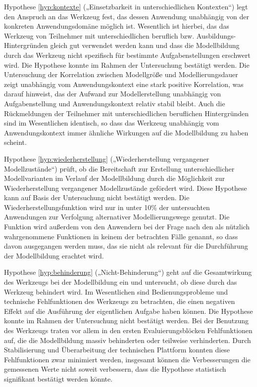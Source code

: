 Hypothese \ref{hyp:kontexte} („Einsetzbarkeit in unterschiedlichen Kontexten“) legt den Anspruch an das Werkzeug fest, das dessen Anwendung unabhängig von der konkreten Anwendungsdomäne möglich ist. Wesentlich ist hierbei, das das Werkzeug von Teilnehmer mit unterschiedlichen beruflich bzw. Ausbildungs-Hintergründen gleich gut verwendet werden kann und dass die Modellbildung durch das Werkzeug nicht spezifisch für bestimmte Aufgabenstellungen erschwert wird. Die Hypothese konnte im Rahmen der Untersuchung bestätigt werden. Die Untersuchung der Korrelation zwischen Modellgröße und Modellierungsdauer zeigt unabhängig vom Anwendungskontext eine stark positive Korrelation, was darauf hinweist, das der Aufwand zur Modellerstellung unabhängig von Aufgabenstellung und Anwendungskontext relativ stabil bleibt. Auch die Rückmeldungen der Teilnehmer mit unterschiedlichen beruflichen Hintergründen sind im Wesentlichen identisch, so dass das Werkzeug unabhängig vom Anwendungskontext immer ähnliche Wirkungen auf die Modellbildung zu haben scheint. 

Hypothese \ref{hyp:wiederherstellung} („Wiederherstellung vergangener Modellzustände“) prüft, ob die Bereitschaft zur Erstellung unterschiedlicher Modellvarianten im Verlauf der Modellbildung durch die Möglichkeit zur Wiederherstellung vergangener Modellzustände gefördert wird. Diese Hypothese kann auf Basis der Untersuchung nicht bestätigt werden. Die Wiederherstellungsfunktion wird nur in unter 10\% der untersuchten Anwendungen zur Verfolgung alternativer Modellierungswege genutzt. Die Funktion wird außerdem von den Anwendern bei der Frage nach den als nützlich wahrgenommene Funktionen in keinem der betrachten Fälle genannt, so dass davon ausgegangen werden muss, das sie nicht als relevant für die Durchführung der Modellbildung erachtet wird.

Hypothese \ref{hyp:behinderung} („Nicht-Behinderung“) geht auf die Gesamtwirkung des Werkzeugs bei der Modellbildung ein und untersucht, ob diese durch das Werkzeug behindert wird. Im Wesentlichen sind Bedienungsprobleme und technische Fehlfunktionen des Werkzeugs zu betrachten, die einen negativen Effekt auf die Ausführung der eigentlichen Aufgabe haben können. Die Hypothese konnte im Rahmen der Untersuchung nicht bestätigt werden. Bei der Benutzung des Werkzeugs traten vor allem in den ersten Evaluierungsblöcken Fehlfunktionen auf, die die Modellbildung massiv behinderten oder teilweise verhinderten. Durch Stabilisierung und Überarbeitung der technischen Plattform konnten diese Fehlfunktionen zwar minimiert werden, insgesamt können die Verbesserungen die gemessenen Werte nicht soweit verbessern, dass die Hypothese statistisch signifikant bestätigt werden könnte. 

